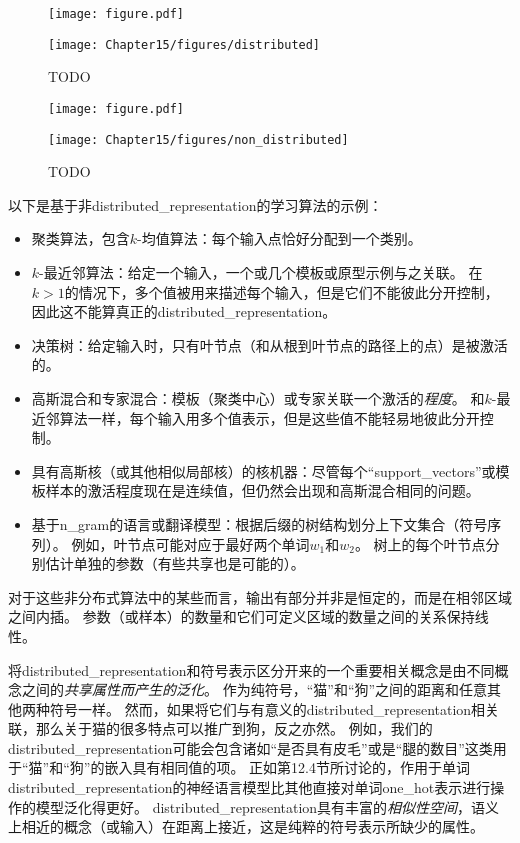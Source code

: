 \begin{figure}[!htb]
\ifOpenSource
\centerline{\texttt{[image: figure.pdf]}}
\else
\centerline{\texttt{[image: Chapter15/figures/distributed]}}
\fi
\caption{TODO}
\label{fig:chap15_distributed}
\end{figure}

\begin{figure}[!htb]
\ifOpenSource
\centerline{\texttt{[image: figure.pdf]}}
\else
\centerline{\texttt{[image: Chapter15/figures/non\_distributed]}}
\fi
\caption{TODO}
\label{fig:chap15_nondistributed}
\end{figure}

以下是基于非\gls{distributed_representation}的学习算法的示例：
\begin{itemize}
	\item 聚类算法，包含$k$-均值算法：每个输入点恰好分配到一个类别。

	\item $k$-最近邻算法：给定一个输入，一个或几个模板或原型示例与之关联。
	在$k > 1$的情况下，多个值被用来描述每个输入，但是它们不能彼此分开控制，因此这不能算真正的\gls{distributed_representation}。

	\item 决策树：给定输入时，只有叶节点（和从根到叶节点的路径上的点）是被激活的。

	\item 高斯混合和专家混合：模板（聚类中心）或专家关联一个激活的\emph{程度}。
	和$k$-最近邻算法一样，每个输入用多个值表示，但是这些值不能轻易地彼此分开控制。

	\item 具有高斯核（或其他相似局部核）的核机器：尽管每个“\gls{support_vectors}”或模板样本的激活程度现在是连续值，但仍然会出现和高斯混合相同的问题。

	\item 基于\gls{n_gram}的语言或翻译模型：根据后缀的树结构划分上下文集合（符号序列）。
	例如，叶节点可能对应于最好两个单词$w_1$和$w_2$。
	树上的每个叶节点分别估计单独的参数（有些共享也是可能的）。
\end{itemize}


对于这些非分布式算法中的某些而言，输出有部分并非是恒定的，而是在相邻区域之间内插。
参数（或样本）的数量和它们可定义区域的数量之间的关系保持线性。


将\gls{distributed_representation}和符号表示区分开来的一个重要相关概念是由不同概念之间的\emph{共享属性而产生的泛化}。
作为纯符号，“猫”和“狗”之间的距离和任意其他两种符号一样。
然而，如果将它们与有意义的\gls{distributed_representation}相关联，那么关于猫的很多特点可以推广到狗，反之亦然。
例如，我们的\gls{distributed_representation}可能会包含诸如“是否具有皮毛”或是“腿的数目”这类用于“猫”和“狗”的嵌入具有相同值的项。
正如第12.4节所讨论的，作用于单词\gls{distributed_representation}的神经语言模型比其他直接对单词\gls{one_hot}表示进行操作的模型泛化得更好。
\gls{distributed_representation}具有丰富的\emph{相似性空间}，语义上相近的概念（或输入）在距离上接近，这是纯粹的符号表示所缺少的属性。

